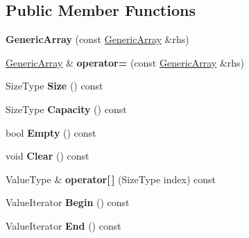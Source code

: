 \subsection*{Public Member Functions}
\begin{DoxyCompactItemize}
\item 
{\bfseries Generic\+Array} (const \hyperlink{class_generic_array}{Generic\+Array} \&rhs)\hypertarget{class_generic_array_aa589d897a194b349d5053391a6f1491d}{}\label{class_generic_array_aa589d897a194b349d5053391a6f1491d}

\item 
\hyperlink{class_generic_array}{Generic\+Array} \& {\bfseries operator=} (const \hyperlink{class_generic_array}{Generic\+Array} \&rhs)\hypertarget{class_generic_array_addbff152092d0998b2c550bd575f4b83}{}\label{class_generic_array_addbff152092d0998b2c550bd575f4b83}

\item 
Size\+Type {\bfseries Size} () const \hypertarget{class_generic_array_a9666a5feb3fccbcec330b53742d00371}{}\label{class_generic_array_a9666a5feb3fccbcec330b53742d00371}

\item 
Size\+Type {\bfseries Capacity} () const \hypertarget{class_generic_array_a12717a6bcd3949dea08ae19a9e940d58}{}\label{class_generic_array_a12717a6bcd3949dea08ae19a9e940d58}

\item 
bool {\bfseries Empty} () const \hypertarget{class_generic_array_a85c783f2f31684901cc2fbf178b1aba5}{}\label{class_generic_array_a85c783f2f31684901cc2fbf178b1aba5}

\item 
void {\bfseries Clear} () const \hypertarget{class_generic_array_a9a67311453f8941f0ac1b5471ec6b99f}{}\label{class_generic_array_a9a67311453f8941f0ac1b5471ec6b99f}

\item 
Value\+Type \& {\bfseries operator\mbox{[}$\,$\mbox{]}} (Size\+Type index) const \hypertarget{class_generic_array_ac928627968bcfff4746f04c2cdd103ef}{}\label{class_generic_array_ac928627968bcfff4746f04c2cdd103ef}

\item 
Value\+Iterator {\bfseries Begin} () const \hypertarget{class_generic_array_a04cb899ae93f89ba91fab09381d731d3}{}\label{class_generic_array_a04cb899ae93f89ba91fab09381d731d3}

\item 
Value\+Iterator {\bfseries End} () const \hypertarget{class_generic_array_aa75006f979b2d810e6ab0ff4f755cf32}{}\label{class_generic_array_aa75006f979b2d810e6ab0ff4f755cf32}


\end{DoxyCompactItemize}
